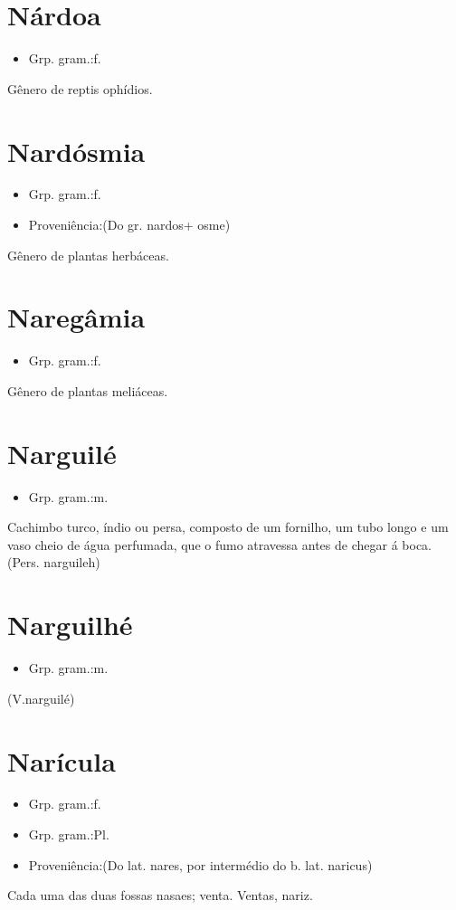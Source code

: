 \section{Nárdoa}
\begin{itemize}
\item {Grp. gram.:f.}
\end{itemize}
Gênero de reptis ophídios.
\section{Nardósmia}
\begin{itemize}
\item {Grp. gram.:f.}
\end{itemize}
\begin{itemize}
\item {Proveniência:(Do gr. \textunderscore nardos\textunderscore  + \textunderscore osme\textunderscore )}
\end{itemize}
Gênero de plantas herbáceas.
\section{Naregâmia}
\begin{itemize}
\item {Grp. gram.:f.}
\end{itemize}
Gênero de plantas meliáceas.
\section{Narguilé}
\begin{itemize}
\item {Grp. gram.:m.}
\end{itemize}
Cachimbo turco, índio ou persa, composto de um fornilho, um tubo longo e um vaso cheio de água perfumada, que o fumo atravessa antes de chegar á boca.
(Pers. \textunderscore narguileh\textunderscore )
\section{Narguilhé}
\begin{itemize}
\item {Grp. gram.:m.}
\end{itemize}
(V.narguilé)
\section{Narícula}
\begin{itemize}
\item {Grp. gram.:f.}
\end{itemize}
\begin{itemize}
\item {Grp. gram.:Pl.}
\end{itemize}
\begin{itemize}
\item {Proveniência:(Do lat. \textunderscore nares\textunderscore , por intermédio do b. lat. \textunderscore naricus\textunderscore )}
\end{itemize}
Cada uma das duas fossas nasaes; venta.
Ventas, nariz.
